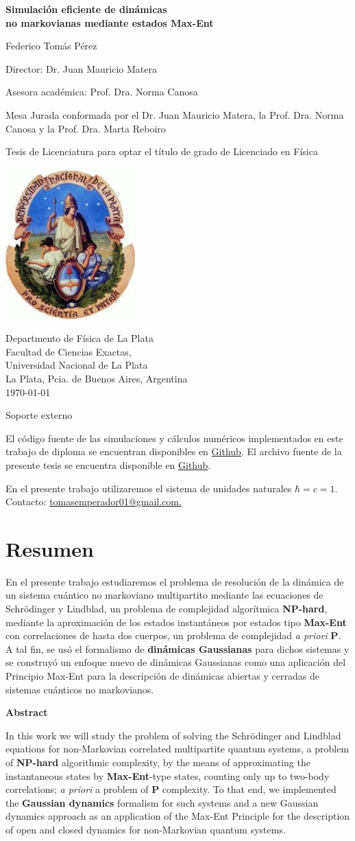 \documentclass{report} %
\providecommand{\HUGE}{\Huge}%
\newcommand{\titleLLL}{
\begin{center}
\vspace*{1cm}
       \textcolor{Dark}{\HUGE \bf Simulación eficiente de dinámicas \\
       no markovianas mediante estados Max-Ent}
       
       \vspace{2cm}
        {\Large Federico Tom\'as P\'erez}\par
        \vspace{0.5cm}
        {\Large Director: Dr. Juan Mauricio         Matera}\par\vspace{0.5cm}
        {\Large Asesora académica: Prof. Dra. Norma       Canosa}\par 
        \vspace{2cm}
        {\Large Mesa Jurada conformada por el Dr. Juan        Mauricio Matera, la Prof. Dra. Norma Canosa y      la Prof. Dra. Marta Reboiro }

\vspace{2cm}
            
       \vfill
       Tesis de Licenciatura para optar el título de grado de Licenciado en Física
        
       \vspace{0.8cm}
     
       \includegraphics[width=5cm]{escudo-UNLP_color.jpg}
       
       Departmento de Física de La Plata \\
       Facultad de Ciencias Exactas, \\
       Universidad Nacional de La Plata\\
       La Plata, Pcia. de Buenos Aires, Argentina\\
       \today
       \end{center}
}
\numberwithin{equation}{section}
\begin{document}
\titleLLL
\newpage

\vspace*{\fill}
{\Large Soporte externo}

\textnormal{  }\newline

\noindent El código fuente de las simulaciones y cálculos numéricos implementados en este trabajo de diploma se encuentran disponibles en \href{https://github.com/licTomasPerez/-Code-Thesis-Non-markovian-Dynamics}{Github}. El archivo fuente de la presente tesis se encuentra disponible en \href{https://github.com/licTomasPerez/Thesis-Efficient-simulation-of-non-markovian-dynamics-using-Max-Ent-states-}{Github}.

En el presente trabajo utilizaremos el sistema de unidades naturales $\hbar = c = 1$. \\

{Contacto}: \href{mailto:tomasemperador01@gmail.com}{tomasemperador01@gmail.com.}

\newpage\null\thispagestyle{empty}\newpage

\tableofcontents
\newpage

\section*{Resumen}

\noindent En el presente trabajo estudiaremos el problema de resolución de la dinámica de un sistema cuántico no markoviano multipartito mediante las ecuaciones de Schrödinger y Lindblad, un problema de complejidad algorítmica \textbf{NP-hard}, mediante la aproximación de los estados instantáneos por estados tipo \textbf{Max-Ent} con correlaciones de hasta dos cuerpos, un problema de complejidad \textit{a priori} \textbf{P}. A tal fin, se usó el formalismo de \textbf{dinámicas Gaussianas} para dichos sistemas y se construyó un enfoque nuevo de dinámicas Gaussianas como una aplicación del Principio Max-Ent para la descripción de dinámicas abiertas y cerradas de sistemas cuánticos no markovianos.  

\vspace*{\fill}
{\Large \textbf{Abstract}}\newline

\noindent In this work we will study the problem of solving the Schrödinger and Lindblad equations for non-Markovian correlated multipartite quantum systems, a problem of \textbf{NP-hard} algorithmic complexity, by the means of approximating the instantaneous states by \textbf{Max-Ent}-type states, counting only up to two-body correlations; \textit{a priori} a problem of \textbf{P} complexity. To that end, we implemented the \textbf{Gaussian dynamics} formalism for such systems and a new Gaussian dynamics approach as an application of the Max-Ent Principle for the description of open and closed dynamics for non-Markovian quantum systems. 
\newpage\null\thispagestyle{empty}\newpage
\end{document}
